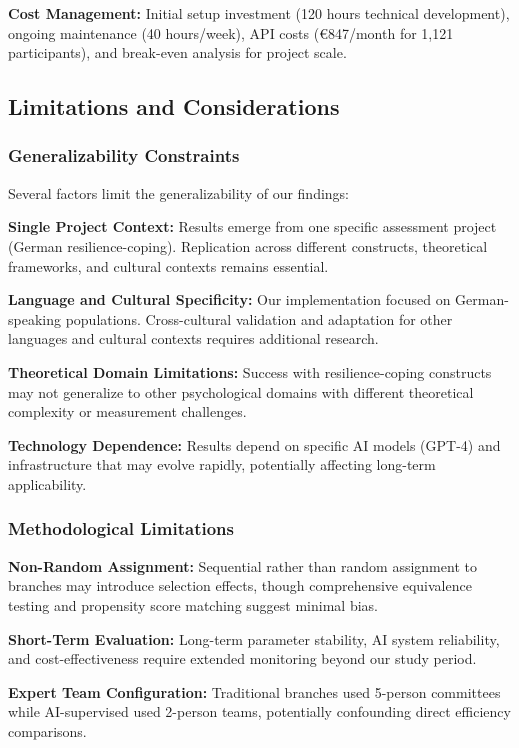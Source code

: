 \documentclass[12pt,a4paper]{article}
\begin{document}
\textbf{Cost Management:} Initial setup investment (120 hours technical development), ongoing maintenance (40 hours/week), API costs (€847/month for 1,121 participants), and break-even analysis for project scale.

\subsection{Limitations and Considerations}

\subsubsection{Generalizability Constraints}

Several factors limit the generalizability of our findings:

\textbf{Single Project Context:} Results emerge from one specific assessment project (German resilience-coping). Replication across different constructs, theoretical frameworks, and cultural contexts remains essential.

\textbf{Language and Cultural Specificity:} Our implementation focused on German-speaking populations. Cross-cultural validation and adaptation for other languages and cultural contexts requires additional research.

\textbf{Theoretical Domain Limitations:} Success with resilience-coping constructs may not generalize to other psychological domains with different theoretical complexity or measurement challenges.

\textbf{Technology Dependence:} Results depend on specific AI models (GPT-4) and infrastructure that may evolve rapidly, potentially affecting long-term applicability.

\subsubsection{Methodological Limitations}

\textbf{Non-Random Assignment:} Sequential rather than random assignment to branches may introduce selection effects, though comprehensive equivalence testing and propensity score matching suggest minimal bias.

\textbf{Short-Term Evaluation:} Long-term parameter stability, AI system reliability, and cost-effectiveness require extended monitoring beyond our study period.

\textbf{Expert Team Configuration:} Traditional branches used 5-person committees while AI-supervised used 2-person teams, potentially confounding direct efficiency comparisons.
\end{document}

